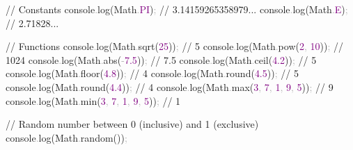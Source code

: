 \documentclass[
  justified,
  openright,
]{tufte-book}
\newcommand{\BuiltInTok}[1]{#1}
\newcommand{\CommentTok}[1]{\textcolor{MidGray}{#1}}
\newcommand{\ConstantTok}[1]{\textcolor{Purple}{#1}}
\newcommand{\DecValTok}[1]{\textcolor{Purple}{#1}}
\newcommand{\FloatTok}[1]{\textcolor{Purple}{#1}}
\newcommand{\FunctionTok}[1]{\textcolor{BrandBlue}{#1}}
\newcommand{\NormalTok}[1]{#1}
\newcommand{\OperatorTok}[1]{\textcolor{DarkGray}{#1}}
\newenvironment{Shaded}{%
  \begin{snugshade}
}{%
  \end{snugshade}
}
\begin{document}
\begin{Shaded}
\begin{Highlighting}[]
\CommentTok{// Constants}
\BuiltInTok{console}\OperatorTok{.}\FunctionTok{log}\NormalTok{(}\BuiltInTok{Math}\OperatorTok{.}\ConstantTok{PI}\NormalTok{)}\OperatorTok{;} \CommentTok{// 3.14159265358979...}
\BuiltInTok{console}\OperatorTok{.}\FunctionTok{log}\NormalTok{(}\BuiltInTok{Math}\OperatorTok{.}\ConstantTok{E}\NormalTok{)}\OperatorTok{;} \CommentTok{// 2.71828...}

\CommentTok{// Functions}
\BuiltInTok{console}\OperatorTok{.}\FunctionTok{log}\NormalTok{(}\BuiltInTok{Math}\OperatorTok{.}\FunctionTok{sqrt}\NormalTok{(}\DecValTok{25}\NormalTok{))}\OperatorTok{;} \CommentTok{// 5}
\BuiltInTok{console}\OperatorTok{.}\FunctionTok{log}\NormalTok{(}\BuiltInTok{Math}\OperatorTok{.}\FunctionTok{pow}\NormalTok{(}\DecValTok{2}\OperatorTok{,} \DecValTok{10}\NormalTok{))}\OperatorTok{;} \CommentTok{// 1024}
\BuiltInTok{console}\OperatorTok{.}\FunctionTok{log}\NormalTok{(}\BuiltInTok{Math}\OperatorTok{.}\FunctionTok{abs}\NormalTok{(}\OperatorTok{{-}}\FloatTok{7.5}\NormalTok{))}\OperatorTok{;} \CommentTok{// 7.5}
\BuiltInTok{console}\OperatorTok{.}\FunctionTok{log}\NormalTok{(}\BuiltInTok{Math}\OperatorTok{.}\FunctionTok{ceil}\NormalTok{(}\FloatTok{4.2}\NormalTok{))}\OperatorTok{;} \CommentTok{// 5}
\BuiltInTok{console}\OperatorTok{.}\FunctionTok{log}\NormalTok{(}\BuiltInTok{Math}\OperatorTok{.}\FunctionTok{floor}\NormalTok{(}\FloatTok{4.8}\NormalTok{))}\OperatorTok{;} \CommentTok{// 4}
\BuiltInTok{console}\OperatorTok{.}\FunctionTok{log}\NormalTok{(}\BuiltInTok{Math}\OperatorTok{.}\FunctionTok{round}\NormalTok{(}\FloatTok{4.5}\NormalTok{))}\OperatorTok{;} \CommentTok{// 5}
\BuiltInTok{console}\OperatorTok{.}\FunctionTok{log}\NormalTok{(}\BuiltInTok{Math}\OperatorTok{.}\FunctionTok{round}\NormalTok{(}\FloatTok{4.4}\NormalTok{))}\OperatorTok{;} \CommentTok{// 4}
\BuiltInTok{console}\OperatorTok{.}\FunctionTok{log}\NormalTok{(}\BuiltInTok{Math}\OperatorTok{.}\FunctionTok{max}\NormalTok{(}\DecValTok{3}\OperatorTok{,} \DecValTok{7}\OperatorTok{,} \DecValTok{1}\OperatorTok{,} \DecValTok{9}\OperatorTok{,} \DecValTok{5}\NormalTok{))}\OperatorTok{;} \CommentTok{// 9}
\BuiltInTok{console}\OperatorTok{.}\FunctionTok{log}\NormalTok{(}\BuiltInTok{Math}\OperatorTok{.}\FunctionTok{min}\NormalTok{(}\DecValTok{3}\OperatorTok{,} \DecValTok{7}\OperatorTok{,} \DecValTok{1}\OperatorTok{,} \DecValTok{9}\OperatorTok{,} \DecValTok{5}\NormalTok{))}\OperatorTok{;} \CommentTok{// 1}

\CommentTok{// Random number between 0 (inclusive) and 1 (exclusive)}
\BuiltInTok{console}\OperatorTok{.}\FunctionTok{log}\NormalTok{(}\BuiltInTok{Math}\OperatorTok{.}\FunctionTok{random}\NormalTok{())}\OperatorTok{;}


\end{Highlighting}
\end{Shaded}
\end{document}
